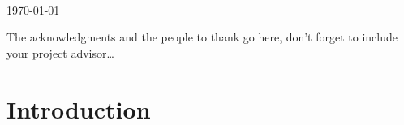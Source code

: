 \documentclass[
10pt, %
oneside, %
english, %
doublespacing, %
headsepline, %
]{MastersDoctoralThesis} %
\begin{document}
\begin{titlepage}
\begin{center}
\textit{}\\[0.4cm]
\groupname\\\deptname\\[2cm] %
 
{\large \today}\\[3cm] %
 
\vfill
\end{center}
\end{titlepage}


\begin{acknowledgements}
\addchaptertocentry{\acknowledgementname} %

The acknowledgments and the people to thank go here, don't forget to include your project advisor\ldots

\end{acknowledgements}


\chapter*{Introduction}



\tableofcontents %

\listoffigures %

\listoftables %


\end{document}
